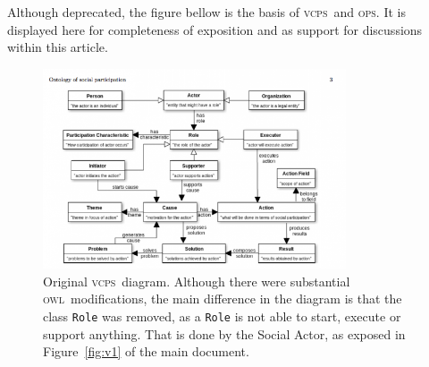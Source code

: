 \documentclass{article}
\newcommand{\ops}{\textsc{ops}}
\newcommand{\vcps}{\textsc{vcps}}
\newcommand{\owl}{\textsc{owl}}
\begin{document}
\vspace{-8cm}

Although deprecated, the figure bellow is the basis of \vcps\ and \ops. It is displayed here for completeness of exposition and as support for discussions within this article. 
\begin{figure}[h]
    \centering
    \includegraphics[width=0.8\textwidth]{../figs/diagramaOriginal}
    \caption{Original \vcps\ diagram. Although there were substantial \owl\ modifications, the main difference in the diagram is that the class \texttt{Role} was removed, as a \texttt{Role} is not able to start, execute or support anything. That is done by the Social Actor, as exposed in Figure~\ref{fig:v1} of the main document.}
    \label{fig:diaorig}
\end{figure}
\end{document}
